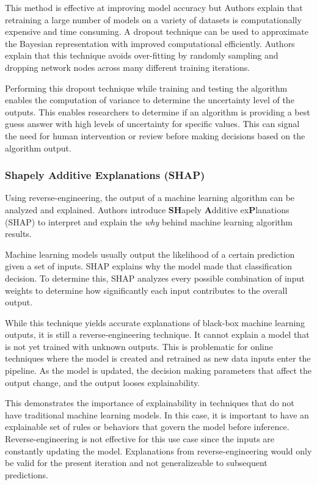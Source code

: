 This method is effective at improving model accuracy but Authors \cite{gal2016dropout} explain that retraining a large number of models on a variety of datasets is computationally expensive and time consuming.
A dropout technique can be used to approximate the Bayesian representation with improved computational efficiently.
Authors \cite{gal2016dropout} explain that this technique avoids over-fitting by randomly sampling and dropping network nodes across many different training iterations.

Performing this dropout technique while training and testing the algorithm enables the computation of variance to determine the uncertainty level of the outputs.
This enables researchers to determine if an algorithm is providing a best guess answer with high levels of uncertainty for specific values.
This can signal the need for human intervention or review before making decisions based on the algorithm output.

\subsubsection{Shapely Additive Explanations (SHAP)}

Using reverse-engineering, the output of a machine learning algorithm can be analyzed and explained. Authors \cite{SHAP-og-paper} introduce \textbf{SH}apely \textbf{A}dditive ex\textbf{P}lanations (SHAP) to interpret and explain the \textit{why} behind machine learning algorithm results.

Machine learning models usually output the likelihood of a certain prediction given a set of inputs. SHAP explains why the model made that classification decision.
To determine this, SHAP analyzes every possible combination of input weights to determine how significantly each input contributes to the overall output.

While this technique yields accurate explanations of black-box machine learning outputs, it is still a reverse-engineering technique.
It cannot explain a model that is not yet trained with unknown outputs.
This is problematic for online techniques where the model is created and retrained as new data inputs enter the pipeline.
As the model is updated, the decision making parameters that affect the output change, and the output looses explainability.

This demonstrates the importance of explainability in techniques that do not have traditional machine learning models.
In this case, it is important to have an explainable set of rules or behaviors that govern the model before inference.
Reverse-engineering is not effective for this use case since the inputs are constantly updating the model.
Explanations from reverse-engineering would only be valid for the present iteration and not generalizeable to subsequent predictions.

